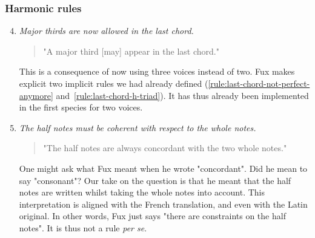 \subsubsection{Harmonic rules}
\begin{enumerate}[wide, label=\bfseries 2.H\arabic*]
\setcounter{enumi}{3} %
    \item \textit{Major thirds are now allowed in the last chord.} \label{rule:major-third-last-chord}    
    \begin{quotation}
        "A major third [may] appear in the last chord."
        \textcite[p.87]{GaPEng}
    \end{quotation}
    This is a consequence of now using three voices instead of two. Fux makes explicit two implicit rules we had already defined (\ref{rule:last-chord-not-perfect-anymore} and~\ref{rule:last-chord-h-triad}). It has thus already been implemented in the first species for two voices.

    \item \textit{The half notes must be coherent with respect to the whole notes.} \label{rule:concur-2nd}    
    \begin{quotation}
        "The half notes are always concordant with the two whole notes."
        \textcite[p.88]{GaPEng}
    \end{quotation}
    One might ask what Fux meant when he wrote "concordant". Did he mean to say "consonant"? Our take on the question is that he meant that the half notes are written whilst taking the whole notes into account. This interpretation is aligned with the French translation, and even with the Latin original. In other words, Fux just says "there are constraints on the half notes". It is thus not a rule \textit{per se}.
\end{enumerate}

